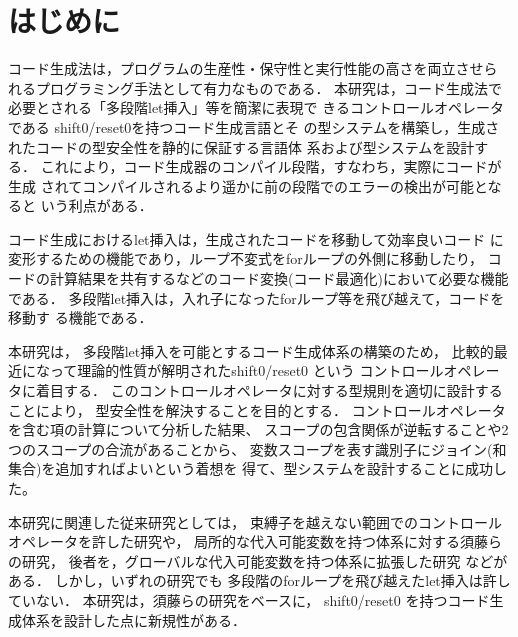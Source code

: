 
\section{はじめに}
コード生成法は，プログラムの生産性・保守性と実行性能の高さを両立させら
れるプログラミング手法として有力なものである．
本研究は，コード生成法で必要とされる「多段階let挿入」等を簡潔に表現で
きるコントロールオペレータである shift0/reset0を持つコード生成言語とそ
の型システムを構築し，生成されたコードの型安全性を静的に保証する言語体
系および型システムを設計する．
これにより，コード生成器のコンパイル段階，すなわち，実際にコードが生成
されてコンパイルされるより遥かに前の段階でのエラーの検出が可能となると
いう利点がある．

コード生成におけるlet挿入は，生成されたコードを移動して効率良いコード
に変形するための機能であり，ループ不変式をforループの外側に移動したり，
コードの計算結果を共有するなどのコード変換(コード最適化)において必要な機能である．
多段階let挿入は，入れ子になったforループ等を飛び越えて，コードを移動す
る機能である．



本研究は，
多段階let挿入を可能とするコード生成体系の構築のため，
比較的最近になって理論的性質が解明されたshift0/reset0 という
コントロールオペレータに着目する．
このコントロールオペレータに対する型規則を適切に設計することにより，
型安全性を解決することを目的とする．
コントロールオペレータを含む項の計算について分析した結果、
スコープの包含関係が逆転することや2つのスコープの合流があることから、
変数スコープを表す識別子にジョイン(和集合)を追加すればよいという着想を
得て、型システムを設計することに成功した。

本研究に関連した従来研究としては，
束縛子を越えない範囲でのコントロールオペレータを許した研究や，
局所的な代入可能変数を持つ体系に対する須藤らの研究\cite{Sudo2014}，
後者を，グローバルな代入可能変数を持つ体系に拡張した研究
\cite{Aplas2016}などがある．
しかし，いずれの研究でも 多段階のforループを飛び越えたlet挿入は許していない．
本研究は，須藤らの研究をベースに，
shift0/reset0 を持つコード生成体系を設計した点に新規性がある．

